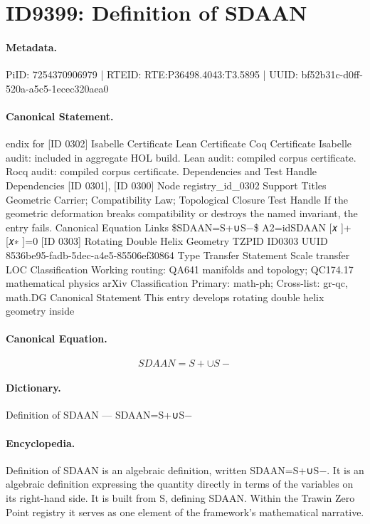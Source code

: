 \section*{ID9399: Definition of SDAAN}
\paragraph{Metadata.}
PiID: 7254370906979 | RTEID: RTE:P36498.4043:T3.5895 | UUID: bf52b31c-d0ff-520a-a5c5-1ecec320aea0

\paragraph{Canonical Statement.}
endix for [ID 0302] Isabelle Certificate Lean Certificate Coq Certificate Isabelle audit: included in aggregate HOL build. Lean audit: compiled corpus certificate. Rocq audit: compiled corpus certificate. Dependencies and Test Handle Dependencies [ID 0301], [ID 0300] Node registry\_id\_0302 Support Titles Geometric Carrier; Compatibility Law; Topological Closure Test Handle If the geometric deformation breaks compatibility or destroys the named invariant, the entry fails. Canonical Equation Links \$SDAAN=S+∪S−\$ A2=idSDAAN [𝑥 ]+[𝑥∗ ]=0 [ID 0303] Rotating Double Helix Geometry TZPID ID0303 UUID 8536be95-fadb-5dec-a4e5-85506ef30864 Type Transfer Statement Scale transfer LOC Classification Working routing: QA641 manifolds and topology; QC174.17 mathematical physics arXiv Classification Primary: math-ph; Cross-list: gr-qc, math.DG Canonical Statement This entry develops rotating double helix geometry inside

\paragraph{Canonical Equation.}
\[
SDAAN=S+∪S−
\]

\paragraph{Dictionary.}
Definition of SDAAN — SDAAN=S+∪S−

\paragraph{Encyclopedia.}
Definition of SDAAN is an algebraic definition, written SDAAN=S+∪S−. It is an algebraic definition expressing the quantity directly in terms of the variables on its right-hand side. It is built from S, defining SDAAN. Within the Trawin Zero Point registry it serves as one element of the framework's mathematical narrative.
